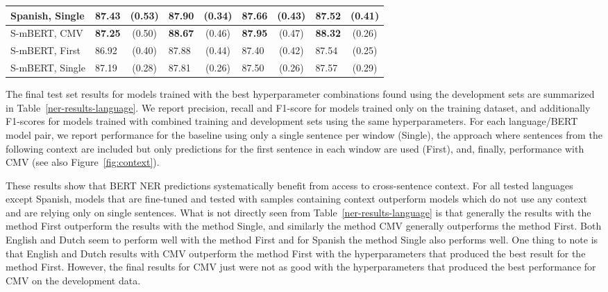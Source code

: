 \begin{table*}[t!]
\begin{tabular}{ll@{\hskip 5pt}cl@{\hskip 5pt}cl@{\hskip 5pt}cl@{\hskip 5pt}c}
Spanish, Single         & 87.43 & (0.53) & 87.90 & (0.34) & 87.66 & (0.43) & 87.52 & (0.41)\\ \hline %
S-mBERT, CMV              & \textbf{87.25} & (0.50) & \textbf{88.67} & (0.46) & \textbf{87.95} & (0.47) & \textbf{88.32} & (0.26)\\ %
S-mBERT, First          & 86.92 & (0.40) & 87.88 & (0.44) & 87.40  & (0.42) & 87.54 & (0.25) \\ %
S-mBERT, Single         & 87.19 & (0.28) & 87.81 & (0.26) & 87.50 & (0.26) & 87.57 & (0.29) \\ \hline %
\end{tabular}
\caption{NER results for different methods and languages (standard deviation in parentheses).}
\label{ner-results-language}
\end{table*}

The final test set results for models trained with the best hyperparameter combinations found using the development sets are summarized in Table~\ref{ner-results-language}. We report precision, recall and F1-score for models trained only on the training dataset, and additionally F1-scores for models trained with combined training and development sets using the same hyperparameters. For each language/BERT model pair, we report performance for the baseline using only a single sentence per window (Single), the approach where sentences from the following context are included but only predictions for the first sentence in each window are used (First), and, finally, performance with CMV (see also Figure~\ref{fig:context}).

These results show that BERT NER predictions systematically benefit from access to cross-sentence context. For all tested languages except Spanish, models that are fine-tuned and tested with samples containing context outperform models which do not use any context and are relying only on single sentences. What is not directly seen from Table~\ref{ner-results-language} is that generally the results with the method First outperform the results with the method Single, and similarly the method CMV generally outperforms the method First. Both English and Dutch seem to perform well with the method First and for Spanish the method Single also performs well. One thing to note is that English and Dutch results with CMV outperform the method First with the hyperparameters that produced the best result for the method First.
However, the final results for CMV just were not as good with the hyperparameters that produced the best performance for CMV on the development data. 

